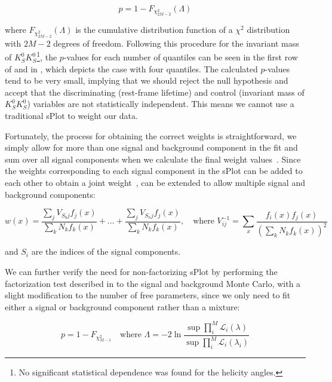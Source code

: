 \begin{equation}
  p = 1 - F_{\chi^2_{2M-2}}(\Lambda)
  \label{eq:significance-test}
\end{equation}

where $F_{\chi^2_{2M-2}}(\Lambda)$ is the cumulative distribution function of a $\chi^2$ distribution with $2M-2$ degrees of freedom. Following this procedure for the invariant mass of $K_S^0K_S^0$\footnote{No significant statistical dependence was found for the helicity angles.}, the $p$-values for each number of quantiles can be seen in the first row of  and in , which depicts the case with four quantiles. The calculated $p$-values tend to be very small, implying that we should reject the null hypothesis and accept that the discriminating (rest-frame lifetime) and control (invariant mass of $K_S^0K_S^0$) variables are not statistically independent. This means we cannot use a traditional sPlot to weight our data.

Fortunately, the process for obtaining the correct weights is straightforward, we simply allow for more than one signal and background component in the fit and sum over all signal components when we calculate the final weight values~\cite{dembinski_custom_2022}. Since the weights corresponding to each signal component in the sPlot can be added to each other to obtain a joint weight~\cite{pivk_splot_2005},  can be extended to allow multiple signal and background components:

\begin{equation}
  w(x) = \frac{\sum_{j} V_{S_0 j}f_j(x)}{\sum_{k}N_kf_k(x)} + ... + \frac{\sum_{j} V_{S_n j}f_j(x)}{\sum_{k}N_kf_k(x)},\quad \text{where } V_{ij}^{-1} = \sum_{x} \frac{f_i(x)f_j(x)}{\left(\sum_{k} N_kf_k(x)\right)^2}
  \label{eq:splot-weights-factorizing}
\end{equation}

and $S_i$ are the indices of the signal components.

We can further verify the need for non-factorizing sPlot by performing the factorization test described in  to the signal and background Monte Carlo, with a slight modification to the number of free parameters, since we only need to fit either a signal or background component rather than a mixture:

\begin{equation}
  p = 1 - F_{\chi^2_{M-1}} \quad\text{where }\Lambda = -2\ln\frac{\sup\prod_i^M \mathcal{L}_i(\lambda)}{\sup\prod_i^M \mathcal{L}_i(\lambda_i)}
  \label{eq:independence-test-mc}
\end{equation}

